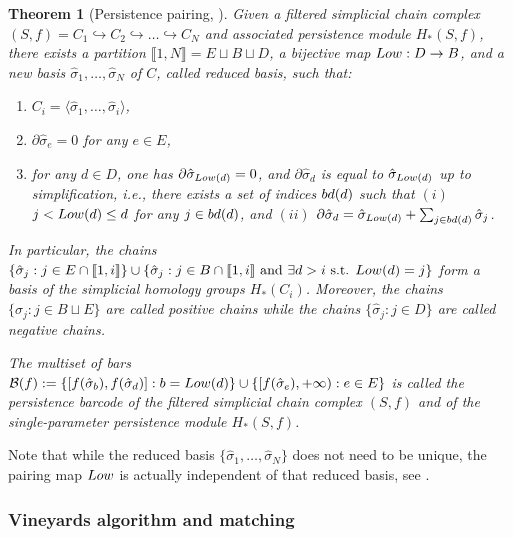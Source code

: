 \documentclass{article}
\newcommand{\pairing}{{\rm Low}}
\newcommand{\reduced}{{\rm bd}}
\newtheorem{theorem}{Theorem}%
\begin{document}
\begin{theorem}[Persistence pairing, {\cite[Theorem 2.6]{desilvaDualitiesPersistentCo2011}}]
	\label{th:pers_pairing}
	Given a filtered simplicial chain complex $(S,f) %
	= C_1\hookrightarrow C_2\hookrightarrow\dots\hookrightarrow C_N$ and associated persistence module $H_*(S,f)$,
	there exists a partition $\llbracket 1,N\rrbracket = E\sqcup B\sqcup D$,
	a bijective map $\pairing:D\rightarrow B$, and a new basis $\hat\sigma_1,\dots,\hat\sigma_N$ of $C$, called {\em reduced basis}, such that:
	\begin{enumerate}
		\item $C_i=\langle \hat\sigma_1,\dots,\hat\sigma_i\rangle$,
		\item $\partial\hat\sigma_e=0$ for any $e\in E$,
		\item for any $d\in D$, one has $\partial\hat\sigma_{\pairing(d)}=0$, and
			$\partial\hat\sigma_{d}$ is equal to $\hat\sigma_{\pairing(d)}$
			{\em up to simplification}, i.e.,
			there exists a set of indices $\reduced(d)$ such that
			$(i)$ $j<\pairing(d)\leq d$ for any $j\in \reduced(d)$, and
			$(ii)$ $\partial\hat\sigma_{d}=\hat\sigma_{\pairing(d)} + \sum_{j \in \reduced(d)}\hat\sigma_j$.
	\end{enumerate}
	In particular, the chains $\{\hat\sigma_j:j\in E \cap \llbracket 1,i\rrbracket\} \cup \{\hat\sigma_j:j\in B \cap \llbracket 1,i\rrbracket \text{ and } \exists d > i\text{ s.t. }\pairing(d)=j\}$
	form a basis of the simplicial homology groups $H_*(C_i)$.
	Moreover, the chains $\{\hat\sigma_j:j\in B\sqcup E\}$ are called {\em positive chains} while the chains $\{\hat\sigma_j:j\in D\}$ are called {\em negative chains}.

	The multiset of bars $\mathcal
	B(f):=\{[f(\hat\sigma_b),f(\hat\sigma_d)]:b=\pairing(d)\}\cup \{[f(\hat\sigma_e),+\infty):e\in E\}$ is called the {\em persistence barcode} of the filtered simplicial chain complex $(S,f)$
	and of the single-parameter persistence module $H_*(S,f)$. \\
\end{theorem}

Note that while
the reduced basis $\{\hat\sigma_1,\dots,\hat\sigma_N\}$ does not need to be unique,
the pairing map $\pairing$ is actually independent of that reduced basis, see \cite[VII.1, Pairing Lemma]{edelsbrunnerComputationalTopologyIntroduction2010}.





\subsubsection{Vineyards algorithm and matching}\label{subsubsec:vineyard}
\end{document}
